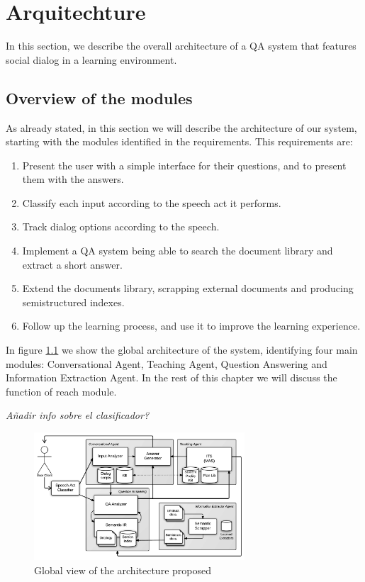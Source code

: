 \chapter{Arquitechture}
\label{chap:architecture}

\begin{chapterintro}

In this section, we describe the overall architecture of a QA system that features social dialog in a learning environment.
 
\end{chapterintro}

\cleardoublepage

\section{Overview of the modules}

As already stated, in this section we will describe the architecture of our system, starting with the modules identified in the requirements. This requirements are:
\begin{enumerate}[noitemsep, label=(\roman*)]
 \item Present the user with a simple interface for their questions, and to present them with the answers.
 \item Classify each input according to the speech act it performs.
 \item Track dialog options according to the speech.
 \item Implement a QA system being able to search the document library and extract a short answer.
 \item Extend the documents library, scrapping external documents and producing semistructured indexes.
 \item Follow up the learning process, and use it to improve the learning experience. 
\end{enumerate}

In figure \ref{fig:arch1} we show the global architecture of the system, identifying four main modules: Conversational Agent, Teaching Agent, Question Answering and Information Extraction Agent. In the rest of this chapter we will discuss the function of reach module.

\color{red}\emph{Añadir info sobre el clasificador?}\color{black}


\begin{figure}[!htbp]
    \centering
    \includegraphics[width=0.7\textwidth]{img/arch/global_1-3.png}
    \caption{Global view of the architecture proposed}
    \label{fig:arch1}
\end{figure}



